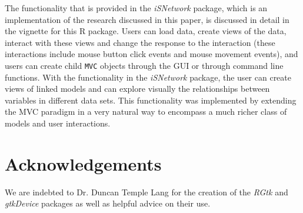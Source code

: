 \documentclass{article}[11pt]
\newcommand{\Robject}[1]{{\texttt{#1}}}
\newcommand{\Rpackage}[1]{{\textit{#1}}}
\begin{document}
The functionality that is provided in the \Rpackage{iSNetwork} package, which
is an implementation of the research discussed in this paper, is
discussed in detail in the vignette for this R package.  Users can load data,
create views of the data, interact with these views and change the response to
the interaction (these interactions include mouse button click events and
mouse movement events), and users can create child \Robject{MVC} objects
through the GUI or through command line functions.  With the functionality in
the \Rpackage{iSNetwork} package, the user can create views of linked models
and can explore visually the relationships between variables in different data
sets.  This functionality was implemented by extending the MVC paradigm in a
very natural way to encompass a much richer class of models and user
interactions. 

\section*{Acknowledgements}
We are indebted to Dr. Duncan Temple Lang for the creation of the
\Rpackage{RGtk} and \Rpackage{gtkDevice} packages as well as helpful advice on
their use.  


\end{document}
